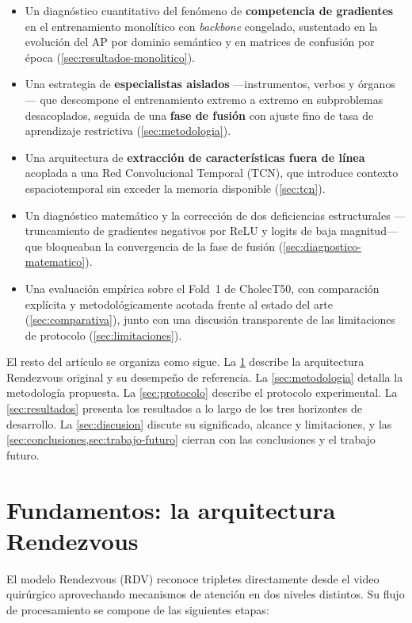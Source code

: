 \documentclass[11pt]{article}
\begin{document}
\begin{itemize}[leftmargin=1.4em]
    \item Un diagnóstico cuantitativo del fenómeno de \textbf{competencia de gradientes} en el entrenamiento monolítico con \emph{backbone} congelado, sustentado en la evolución del AP por dominio semántico y en matrices de confusión por época (\cref{sec:resultados-monolitico}).
    \item Una estrategia de \textbf{especialistas aislados} —instrumentos, verbos y órganos— que descompone el entrenamiento extremo a extremo en subproblemas desacoplados, seguida de una \textbf{fase de fusión} con ajuste fino de tasa de aprendizaje restrictiva (\cref{sec:metodologia}).
    \item Una arquitectura de \textbf{extracción de características fuera de línea} acoplada a una Red Convolucional Temporal (TCN), que introduce contexto espaciotemporal sin exceder la memoria disponible (\cref{sec:tcn}).
    \item Un diagnóstico matemático y la corrección de dos deficiencias estructurales —truncamiento de gradientes negativos por ReLU y logits de baja magnitud— que bloqueaban la convergencia de la fase de fusión (\cref{sec:diagnostico-matematico}).
    \item Una evaluación empírica sobre el Fold~1 de CholecT50, con comparación explícita y metodológicamente acotada frente al estado del arte (\cref{sec:comparativa}), junto con una discusión transparente de las limitaciones de protocolo (\cref{sec:limitaciones}).
\end{itemize}

El resto del artículo se organiza como sigue. La \cref{sec:fundamentos} describe la arquitectura Rendezvous original y su desempeño de referencia. La \cref{sec:metodologia} detalla la metodología propuesta. La \cref{sec:protocolo} describe el protocolo experimental. La \cref{sec:resultados} presenta los resultados a lo largo de los tres horizontes de desarrollo. La \cref{sec:discusion} discute su significado, alcance y limitaciones, y las \cref{sec:conclusiones,sec:trabajo-futuro} cierran con las conclusiones y el trabajo futuro.

\section{Fundamentos: la arquitectura Rendezvous}
\label{sec:fundamentos}

El modelo Rendezvous (RDV) \cite{nwoye2022rendezvous} reconoce tripletes directamente desde el video quirúrgico aprovechando mecanismos de atención en dos niveles distintos. Su flujo de procesamiento se compone de las siguientes etapas:
\end{document}
